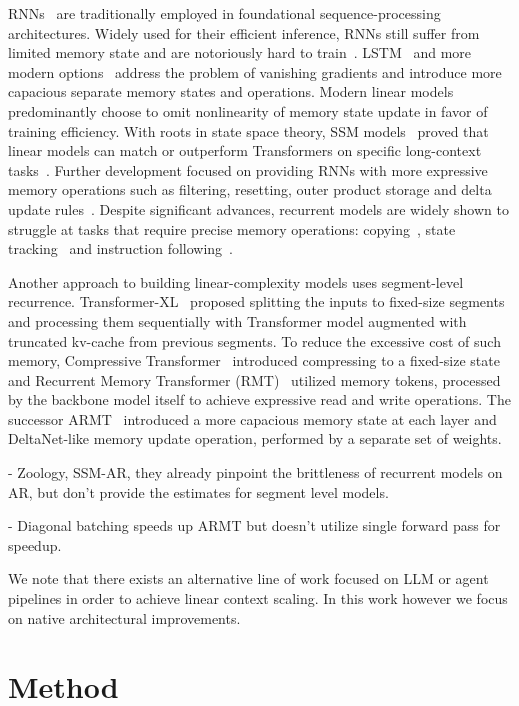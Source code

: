 \documentclass[11pt]{article}
\begin{document}
RNNs~\citep{elman} are traditionally employed in foundational sequence-processing architectures. Widely used for their efficient inference, RNNs still suffer from limited memory state and are notoriously hard to train~\citep{on the complexities of training RNN}. LSTM~\citep{lstm} and more modern options~\citep{GRU, LRU} address the problem of vanishing gradients and introduce more capacious separate memory states and operations. 
Modern linear models predominantly choose to omit nonlinearity of memory state update in favor of training efficiency. With roots in state space theory, SSM models~\citep{Hippo, S4} proved that linear models can match or outperform Transformers on specific long-context tasks~\citep{LRA}. Further development focused on providing RNNs with more expressive memory operations such as filtering, resetting, outer product storage and delta update rules~\citep{Mamba, Mamba2, DN, parallelizing with DN, GDN}. Despite significant advances, recurrent models are widely shown to struggle at tasks that require precise memory operations: copying~\citep{}, state tracking~\citep{} and instruction following~\citep{}.

Another approach to building linear-complexity models uses segment-level recurrence. Transformer-XL~\citep{} proposed splitting the inputs to fixed-size segments and processing them sequentially with Transformer model augmented with truncated kv-cache from previous segments. To reduce the excessive cost of such memory, Compressive Transformer~\citep{} introduced compressing to a fixed-size state and Recurrent Memory Transformer (RMT)~\citep{} utilized memory tokens, processed by the backbone model itself to achieve expressive read and write operations. The successor ARMT~\citep{} introduced a more capacious memory state at each layer and DeltaNet-like memory update operation, performed by a separate set of weights. 


- Zoology, SSM-AR, they already pinpoint the brittleness of recurrent models on AR, but don't provide the estimates for segment level models. 

- Diagonal batching speeds up ARMT but doesn't utilize single forward pass for speedup.

We note that there exists an alternative line of work focused on LLM or agent pipelines in order to achieve linear context scaling. In this work however we focus on native architectural improvements.


\section{Method}
\end{document}
